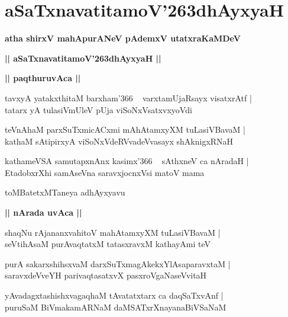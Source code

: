 \documentclass[twoside,12pt,openright]{book}
\def\S{\char'263}
\newcounter{shloka}[chapter]
\def\uvaca#1{\centerline{{\large\textbf{#1}}}}
\begin{document}
\chapter{aSaTxnavatitamoV\S dhAyxyaH}

\begin{center}
{\LARGE\bfseries atha shirxV mahApurANeV pAdemxV utatxraKaMDeV}
\end{center}

\begin{center}
{\LARGE\bfseries || aSaTxnavatitamoV\S dhAyxyaH || }
\end{center}

\uvaca{|| paqthuruvAca ||}

\begin{shloka}%
tavxyA yatakxthitaM barxham\char'366 ~ varxtamUjaRsayx visatxrAtf |\\
tatarx yA tulasiVmUleV pUja viSoNxVsatxvxyoVdi
\end{shloka}

\begin{shloka}%
teVnAhaM parxSuTxmicACxmi mAhAtamxyXM tuLasiVBavaM |\\
kathaM sAtipirxyA viSoNxVdeRVvadeVvasayx shAknigxRNaH 
\end{shloka}

\begin{shloka}%
kathameVSA samutapxnAnx kasimx\char'366 ~ sAthxneV ca nAradaH |\\
EtadobxrXhi samAseVna saravxjocnxVsi matoV mama
\end{shloka}

\begin{center}
toMBatetxMTaneya adhAyxyavu
\end{center}

\uvaca{|| nArada uvAca ||}

\begin{shloka}%
shaqNu rAjananxvahitoV mahAtamxyXM tuLasiVBavaM |\\
seVtihAsaM purAvaqtatxM tatasxravxM kathayAmi teV 
\end{shloka}

\begin{shloka}%
purA sakarxshihsxvaM darxSuTxmagAkekxYlAsaparavxtaM |\\
saravxdeVveYH parivaqtasatxvX pasxroVgaNaseVvitaH 
\end{shloka}

\begin{shloka}%
yAvadagxtashishxvagaqhaM tAvatatxtarx ca daqSaTxvAnf |\\
puruSaM BiVmakamARNaM daMSATxrXnayanaBiVSaNaM 
\end{shloka}
\end{document}
